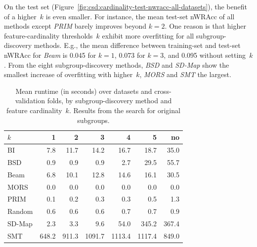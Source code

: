 \documentclass[acmsmall]{acmart} %
\theoremstyle{acmplain}
\theoremstyle{acmdefinition}
\begin{document}
On the test set (Figure~\ref{fig:csd:cardinality-test-nwracc-all-datasets}), the benefit of a higher~$k$ is even smaller.
For instance, the mean test-set nWRAcc of all methods except \emph{PRIM} barely improves beyond $k=2$.
One reason is that higher feature-cardinality thresholds~$k$ exhibit more overfitting for all subgroup-discovery methods.
E.g., the mean difference between training-set and test-set nWRAcc for \emph{Beam} is 0.045 for $k=1$, 0.073 for $k=3$, and 0.095 without setting~$k$.
From the eight subgroup-discovery methods, \emph{BSD} and \emph{SD-Map} show the smallest increase of overfitting with higher~$k$, \emph{MORS} and \emph{SMT} the largest.

\begin{table}[t]
	\centering
	\caption{
		Mean runtime (in seconds) over datasets and cross-validation folds, by subgroup-discovery method and feature cardinality~$k$.
		Results from the search for original subgroups.
	}
	\begin{tabular}{lrrrrrr}
		\toprule
		$k$ & 1 & 2 & 3 & 4 & 5 & no \\
		\midrule
		BI & 7.8 & 11.7 & 14.2 & 16.7 & 18.7 & 35.0 \\
		BSD & 0.9 & 0.9 & 0.9 & 2.7 & 29.5 & 55.7 \\
		Beam & 6.8 & 10.1 & 12.8 & 14.6 & 16.1 & 30.5 \\
		MORS & 0.0 & 0.0 & 0.0 & 0.0 & 0.0 & 0.0 \\
		PRIM & 0.1 & 0.2 & 0.3 & 0.3 & 0.5 & 1.3 \\
		Random & 0.6 & 0.6 & 0.6 & 0.7 & 0.7 & 0.9 \\
		SD-Map & 2.3 & 3.3 & 9.6 & 54.0 & 345.2 & 367.4 \\
		SMT & 648.2 & 911.3 & 1091.7 & 1113.4 & 1117.4 & 849.0 \\
		\bottomrule
	\end{tabular}
	\label{tab:csd:cardinality-runtime}
\end{table}
\end{document}
